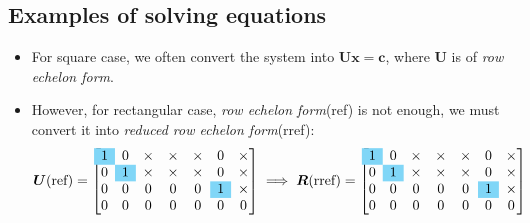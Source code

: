\subsection{Examples of solving equations}

\begin{itemize}
\item
For square case, we often convert the system into $\bm{Ux} = \bm c$, where $\bm U$ is of \textit{row echelon form}.
\item
However, for rectangular case, \textit{row echelon form}(ref) is not enough, we must convert it into \emph{reduced row echelon form}(rref):
\[\bm U\text{(ref)} = \left[
\begin{array}{@{}ccccccc@{}}
\cellcolor{cyan!50}1&0&\x&\x&\x&0&\x\\
0&\cellcolor{cyan!50}1&\x&\x&\x&0&\x\\
0&0&0&0&0&\cellcolor{cyan!50}1&\x\\
0&0&0&0&0&0&0
\end{array}
\right]
\implies
\bm R\text{(rref)} = \left[
\begin{array}{@{}ccccccc@{}}
\cellcolor{cyan!50}1&0&\x&\x&\x&0&\x\\
0&\cellcolor{cyan!50}1&\x&\x&\x&0&\x\\
0&0&0&0&0&\cellcolor{cyan!50}1&\x\\
0&0&0&0&0&0&0
\end{array}
\right]\]
\end{itemize}
